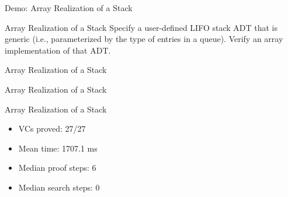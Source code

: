 \begin{frame}{Demo: Array Realization of a Stack}
~
\end{frame}


\begin{frame}{Array Realization of a Stack}
	Specify a user-defined LIFO stack ADT that is generic (i.e., parameterized by the type of entries in a queue). Verify an array implementation of that ADT.
\end{frame}


\begin{frame}{Array Realization of a Stack}
	
\end{frame}


\begin{frame}{Array Realization of a Stack}
	
\end{frame}


\begin{frame}{Array Realization of a Stack}
	\begin{itemize}
		\item VCs proved: 27/27
		\item Mean time: 1707.1 ms
		\item Median proof steps: 6
		\item Median search steps: 0
	\end{itemize}
\end{frame}



